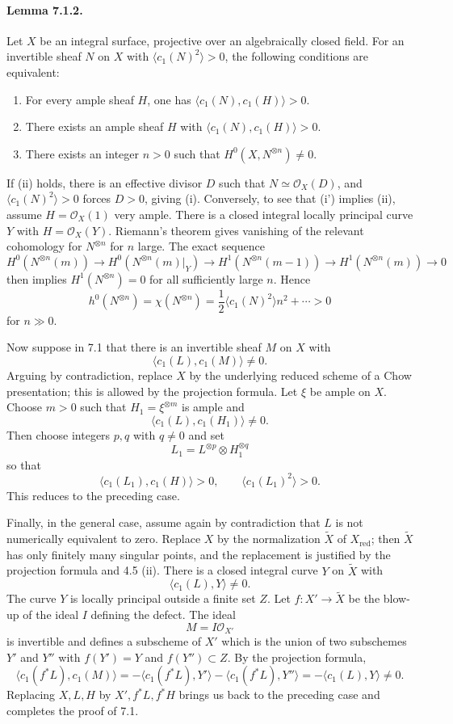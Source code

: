 \documentclass[12pt]{article}
\newcommand{\cO}{\mathcal O}
\newcommand{\red}{\mathrm{red}}
\begin{document}
\paragraph{Lemma 7.1.2.}
Let $X$ be an integral surface, projective over an algebraically closed field. For an invertible sheaf $N$ on $X$ with $\langle c_1(N)^2\rangle>0$, the following conditions are equivalent:
\begin{enumerate}[label=\roman*)]
\item For every ample sheaf $H$, one has $\langle c_1(N),c_1(H)\rangle>0$.
\item[\textup{i'}] There exists an ample sheaf $H$ with $\langle c_1(N),c_1(H)\rangle>0$.
\item There exists an integer $n>0$ such that $H^0(X,N^{\otimes n})\neq 0$.
\end{enumerate}

If (ii) holds, there is an effective divisor $D$ such that $N\simeq\cO_X(D)$, and $\langle c_1(N)^2\rangle>0$ forces $D>0$, giving (i). Conversely, to see that (i') implies (ii), assume $H=\cO_X(1)$ very ample. There is a closed integral locally principal curve $Y$ with $H=\cO_X(Y)$. Riemann's theorem gives vanishing of the relevant cohomology for $N^{\otimes n}$ for $n$ large. The exact sequence
\[
H^0(N^{\otimes n}(m))\to H^0(N^{\otimes n}(m)|_Y)\to
H^1(N^{\otimes n}(m-1))\to H^1(N^{\otimes n}(m))\to 0
\]
then implies $H^1(N^{\otimes n})=0$ for all sufficiently large $n$. Hence
\[
h^0(N^{\otimes n})=\chi(N^{\otimes n})
  =\frac12\langle c_1(N)^2\rangle n^2+\cdots>0
\]
for $n\gg0$.

Now suppose in 7.1 that there is an invertible sheaf $M$ on $X$ with
\[
\langle c_1(L),c_1(M)\rangle\neq 0.
\]
Arguing by contradiction, replace $X$ by the underlying reduced scheme of a Chow presentation; this is allowed by the projection formula. Let $\xi$ be ample on $X$. Choose $m>0$ such that $H_1=\xi^{\otimes m}$ is ample and
\[
\langle c_1(L),c_1(H_1)\rangle\neq 0.
\]
Then choose integers $p,q$ with $q\neq0$ and set
\[
L_1=L^{\otimes p}\otimes H_1^{\otimes q}
\]
so that
\[
\langle c_1(L_1),c_1(H)\rangle>0,\qquad
\langle c_1(L_1)^2\rangle>0.
\]
This reduces to the preceding case.

Finally, in the general case, assume again by contradiction that $L$ is not numerically equivalent to zero. Replace $X$ by the normalization $\widetilde X$ of $X_{\red}$; then $\widetilde X$ has only finitely many singular points, and the replacement is justified by the projection formula and 4.5 (ii). There is a closed integral curve $Y$ on $\widetilde X$ with
\[
\langle c_1(L),Y\rangle\neq 0.
\]
The curve $Y$ is locally principal outside a finite set $Z$. Let $f:X'\to \widetilde X$ be the blow-up of the ideal $I$ defining the defect. The ideal
\[
M=I\cO_{X'}
\]
is invertible and defines a subscheme of $X'$ which is the union of two subschemes $Y'$ and $Y''$ with $f(Y')=Y$ and $f(Y'')\subset Z$. By the projection formula,
\[
\langle c_1(f^*L),c_1(M)\rangle
  =-\langle c_1(f^*L),Y'\rangle-\langle c_1(f^*L),Y''\rangle
  =-\langle c_1(L),Y\rangle\neq 0.
\]
Replacing $X,L,H$ by $X',f^*L,f^*H$ brings us back to the preceding case and completes the proof of 7.1.
\end{document}
